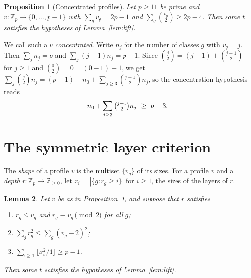 \documentclass[11pt]{article}
\newtheorem{lemma}{Lemma}[section]
\newtheorem{proposition}[lemma]{Proposition}
\theoremstyle{remark}
\newcommand{\Z}{\mathbb{Z}}
\begin{document}
\begin{proposition}[Concentrated profiles]\label{prop:cpl}
Let $p\ge11$ be prime and $v\colon\Z_p\to\{0,\dots,p-1\}$ with $\sum_g v_g=2p-1$ and $\sum_g\binom{v_g}2\ge 2p-4$. Then some $t$ satisfies the hypotheses of Lemma~\ref{lem:lift}.
\end{proposition}

We call such a $v$ \emph{concentrated}. Write $n_j$ for the number of classes $g$ with $v_g=j$. Then $\sum_j n_j=p$ and $\sum_j(j-1)n_j=p-1$. Since $\binom j2=(j-1)+\binom{j-1}2$ for $j\ge1$ and $\binom02=0=(0-1)+1$, we get $\sum_j\binom j2n_j=(p-1)+n_0+\sum_{j\ge3}\binom{j-1}2n_j$, so the concentration hypothesis reads
\begin{equation}\label{eq:conc}
n_0+\sum_{j\ge3}\tbinom{j-1}{2}n_j\ \ge\ p-3 .
\end{equation}

\section{The symmetric layer criterion}\label{sec:slc}

The \emph{shape} of a profile $v$ is the multiset $\{v_g\}$ of its sizes. For a profile $v$ and a \emph{depth} $r\colon\Z_p\to\Z_{\ge0}$, let $x_i=|\{g:r_g\ge i\}|$ for $i\ge1$, the sizes of the layers of $r$.

\begin{lemma}\label{lem:slc}
Let $v$ be as in Proposition~\ref{prop:cpl}, and suppose that $r$ satisfies
\begin{enumerate}
\item[(D)] $r_g\le v_g$ and $r_g\equiv v_g\pmod 2$ for all $g$;
\item[(W)] $\sum_g r_g^2\le\sum_g(v_g-2)^2$;
\item[(S)] $\sum_{i\ge1}\lfloor x_i^2/4\rfloor\ge p-1$.
\end{enumerate}
Then some $t$ satisfies the hypotheses of Lemma~\ref{lem:lift}.
\end{lemma}
\end{document}
